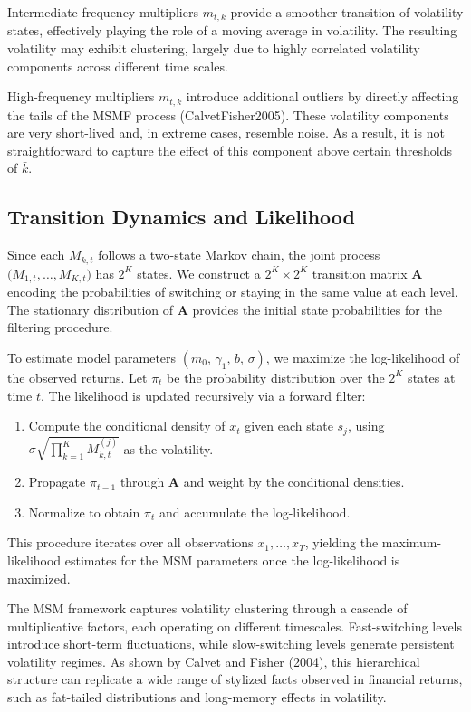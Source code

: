 \documentclass[11pt]{extarticle}
\begin{document}
Intermediate-frequency multipliers $m_{t,k}$ provide a smoother transition of volatility states,
effectively playing the role of a moving average in volatility. The resulting volatility may exhibit
clustering, largely due to highly correlated volatility components across different time scales.


High-frequency multipliers $m_{t,k}$ introduce additional outliers by directly affecting the
tails of the MSMF process (CalvetFisher2005). These volatility components are very short-lived and,
in extreme cases, resemble noise. As a result, it is not straightforward to capture the effect of this
component above certain thresholds of $\bar{k}$.

\subsection{Transition Dynamics and Likelihood}
Since each $M_{k,t}$ follows a two-state Markov chain, the joint process $\bigl(M_{1,t}, \dots, M_{K,t}\bigr)$ has $2^K$ states. We construct a $2^K \times 2^K$ transition matrix $\mathbf{A}$ encoding the probabilities of switching or staying in the same value at each level. The stationary distribution of $\mathbf{A}$ provides the initial state probabilities for the filtering procedure.

To estimate model parameters $(m_0,\,\gamma_1,\,b,\,\sigma)$, we maximize the log-likelihood of the observed returns. Let $\pi_t$ be the probability distribution over the $2^K$ states at time $t$. The likelihood is updated recursively via a forward filter:
\begin{enumerate}
    \item Compute the conditional density of $x_t$ given each state $s_j$,
          using $\sigma \sqrt{\prod_{k=1}^K M_{k,t}^{(j)}}$ as the volatility.
    \item Propagate $\pi_{t-1}$ through $\mathbf{A}$ and weight by the conditional densities.
    \item Normalize to obtain $\pi_t$ and accumulate the log-likelihood.
\end{enumerate}
This procedure iterates over all observations $x_1,\ldots,x_T$, yielding the maximum-likelihood estimates for the MSM parameters once the log-likelihood is maximized.

The MSM framework captures volatility clustering through a cascade of multiplicative factors, each operating on different timescales. Fast-switching levels introduce short-term fluctuations, while slow-switching levels generate persistent volatility regimes. As shown by Calvet and Fisher (2004), this hierarchical structure can replicate a wide range of stylized facts observed in financial returns, such as fat-tailed distributions and long-memory effects in volatility.
\end{document}
